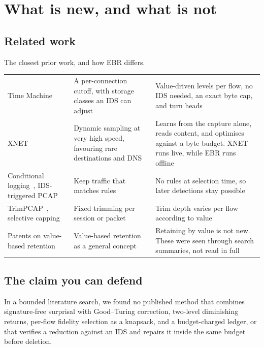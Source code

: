 
\chapter{What is new, and what is not}
\label{ch:novel}

\section{Related work}
\begin{gtable}{The closest prior work, and how EBR differs.}
\begin{tabularx}{\linewidth}{l L L}
\toprule
{} &  & \\
\midrule
Time Machine~\cite{timemachine,timetravel} & A per-connection cutoff, with storage classes an IDS can adjust & Value-driven levels per flow, no IDS needed, an exact byte cap, and turn heads\\
XNET~\cite{xnet} & Dynamic sampling at very high speed, favouring rare destinations and DNS & Learns from the capture alone, reads content, and optimises against a byte budget. XNET runs live, while EBR runs offline\\
Conditional logging~\cite{suricata}, IDS-triggered PCAP~\cite{sanspcap} & Keep traffic that matches rules & No rules at selection time, so later detections stay possible\\
TrimPCAP~\cite{trimpcap}, selective capping~\cite{capping} & Fixed trimming per session or packet & Trim depth varies per flow according to value\\
Patents on value-based retention & Value-based retention as a general concept & Retaining by value is not new. These were seen through search summaries, not read in full\\
\bottomrule
\end{tabularx}
\end{gtable}

\section{The claim you can defend}
\begin{bigidea}
In a bounded literature search, we found no published method that combines signature-free surprisal with Good--Turing correction, two-level diminishing returns, per-flow fidelity selection as a knapsack, and a budget-charged ledger, or that verifies a reduction against an IDS and repairs it inside the same budget before deletion.
\end{bigidea}

